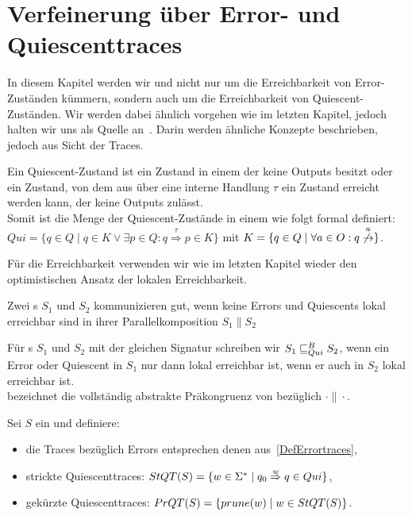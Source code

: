 \chapter{Verfeinerung über Error- und Quiescenttraces}

In diesem Kapitel werden wir und nicht nur um die Erreichbarkeit von
Error-Zuständen kümmern, sondern auch um die Erreichbarkeit von
Quiescent-Zuständen. Wir werden dabei ähnlich vorgehen wie im letzten Kapitel,
jedoch halten wir uns als Quelle an~\cite{Chilton2013}. Darin werden ähnliche Konzepte
beschrieben, jedoch aus Sicht der Traces.

\begin{Def}[Quiescent]
  Ein Quiescent-Zustand ist ein Zustand in einem \EIO{} der keine Outputs besitzt
  oder ein Zustand, von dem aus über eine interne Handlung $\tau$ ein Zustand
  erreicht werden kann, der keine Outputs zulässt.\\
  Somit ist die Menge der Quiescent-Zustände in einem \EIO{} wie folgt formal
  definiert: $Qui=\{q\in Q\mid q\in K\vee \exists p\in Q:
  q\overset{\tau}{\Rightarrow} p\in K\}$ mit $K=\{q\in Q\mid \forall a\in O:
  q\overset{a}{\not{\hspace{-0.1cm}\rightarrow}}\}$.
\end{Def}

Für die Erreichbarkeit verwenden wir wie im letzten Kapitel wieder den
optimistischen Ansatz der lokalen Erreichbarkeit.

\begin{Def}
  Zwei \EIO{}s $S_1$ und $S_2$ kommunizieren gut, wenn keine Errors und Quiescents
  lokal erreichbar sind in ihrer Parallelkomposition $S_1\| S_2$
\end{Def}

\begin{Def}
  Für \EIO{}s $S_1$ und $S_2$ mit der gleichen Signatur schreiben wir
  $S_1\sqsubseteq _{Qui}^B S_2$, wenn ein Error oder Quiescent in $S_1$ nur
  dann lokal erreichbar ist, wenn er auch in $S_2$ lokal erreichbar ist.\\
  \QCRel{} bezeichnet die vollständig abstrakte Präkongruenz von \QBRel{}
  bezüglich $\cdot\|\cdot$.
\end{Def}

\begin{Def}
  \label{DefQuiescenttraces}
  Sei $S$ ein \EIO{} und definiere:
  \begin{itemize}
    \item die Traces bezüglich Errors entsprechen denen
      aus~\ref{DefErrortraces},
    \item strickte Quiescenttraces: $StQT{}(S) = \{w\in\Sigma ^*\mid q_0
      \overset{w}{\Rightarrow} q\in Qui\}$,
    \item gekürzte Quiescenttraces: $PrQT{}(S) = \{prune(w)\mid w\in StQT{}(S)\}$.
  \end{itemize}
\end{Def}

